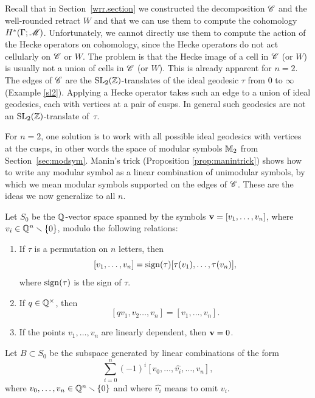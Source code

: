 \subsection{}\label{mod.symbs}
%
Recall that in Section~\ref{wrr.section} we constructed the \Vor
decomposition $\mathscr C$ and the well-rounded retract $W$ and that we can
use them to compute the cohomology $H^{*} (\Gamma ;\mathscr M)$.
Unfortunately, we cannot directly use them to compute the action of the
Hecke operators on cohomology, since the Hecke operators do not act
cellularly on $\mathscr C$ or $W$.  The problem is that the Hecke image of a
cell in $\mathscr C$ (or $W$) is usually not a union of cells in $\mathscr C$ (or
$W$).  This is already apparent for $n=2$.  The edges of $\mathscr C$ are the
$\operatorname{SL}_{2} (\mathbb{Z})$-translates of the ideal geodesic $\tau$ from $0$ to
$\infty$ (Example \ref{sl2}).  Applying a Hecke operator takes such an
edge to a union of ideal geodesics, each with vertices at a pair of
cusps.  In general such geodesics are not an $\operatorname{SL}_{2} (\mathbb{Z})$-translate
of~$\tau$.  

For $n=2$, one solution is to work with all possible ideal geodesics
with vertices at the cusps, in other words the space of modular
symbols $\mathbb{M}_{2}$ from Section~\ref{sec:modsym}.  Manin's trick (Proposition
\ref{prop:manintrick}) shows how to write any modular symbol as a
linear combination of unimodular symbols, by which we mean modular
symbols supported on the edges of $\mathscr C$.  These are the ideas we now
generalize to all $n$.

\begin{definition}\label{def:modular.symbols}
Let $S_{0}$ be the $\mathbb{Q}$-vector space
spanned by the symbols ${\mathbf {v}} = [v_{1},\dotsc ,v_{n}]$, where $v_{i}\in
\mathbb{Q}^{n}\smallsetminus \{0 \}$, modulo the following relations:
\begin{enumerate}
\item If $\tau $ is a permutation on $n$ letters, then
\[
[v_{1},\ldots,v_{n}] = \operatorname{sign} (\tau ) [\tau (v_{1}),\ldots,\tau
(v_{n})], 
\]
where $\operatorname{sign} (\tau )$ is the sign of $\tau $.
\item  \label{projpts} If $q\in \mathbb{Q}^{\times }$, then 
\[
[q v_{1},v_{2}\ldots,v_{n}] = [v_{1},\ldots,v_{n}].
\]
\item \label{lindep} If the points $v_{1},\dotsc ,v_{n}$ are linearly dependent, then ${\mathbf {v}} = 0$.
\end{enumerate}
Let $B\subset S_{0}$ be the subspace generated by linear combinations
of the form 
\begin{equation}\label{fundrel}
\sum _{i=0}^{n}  (-1)^{i}
[v_{0},\ldots,\hat{v_{i}},\ldots,v_{n}],  
\end{equation}
where $v_{0},\dotsc ,v_{n}\in
\mathbb{Q}^{n}\smallsetminus \{0 \}$ and where $\hat{v_{i}}$ means to omit $v_{i}$.
\end{definition}

